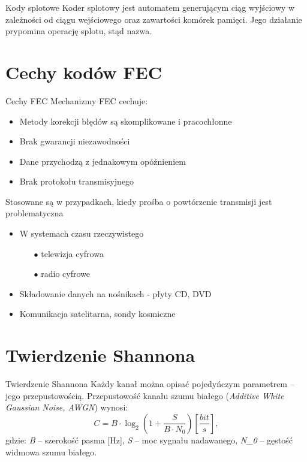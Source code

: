 \documentclass[12pt]{beamer}
\begin{document}
\begin{frame}{Kody splotowe}
Koder splotowy jest automatem generującym ciąg wyjściowy w zależności od ciągu wejściowego oraz zawartości komórek pamięci. Jego działanie prypomina operację splotu, stąd nazwa.
\end{frame}

\section{Cechy kodów FEC}
\begin{frame}{Cechy FEC}
Mechanizmy FEC cechuje:
\begin{itemize}
	\item Metody korekcji błędów są skomplikowane i pracochłonne
	\item Brak gwarancji niezawodności
	\item Dane przychodzą z jednakowym opóźnieniem
	\item Brak protokołu transmisyjnego
\end{itemize}
Stosowane są w przypadkach, kiedy prośba o powtórzenie transmisji jest problematyczna
\begin{itemize}
	\item W systemach czasu rzeczywistego
	\begin{itemize}
		\item[$\bullet$] telewizja cyfrowa
		\item[$\bullet$] radio cyfrowe		
	\end{itemize}
	\item Składowanie danych na nośnikach - płyty CD, DVD
	\item Komunikacja satelitarna, sondy kosmiczne
\end{itemize}
\end{frame}

\section{Twierdzenie Shannona}
\begin{frame}{Twierdzenie Shannona}
Każdy kanał można opisać pojedyńczym parametrem -- jego przepustowością.
Przepustowość kanału szumu białego (\emph{Additive White Gaussian Noise, AWGN}) wynosi:
\begin{equation}
C=B\cdot\log_2(1+\frac{S}{B \cdot N_0}) [\frac{bit}{s}],
\end{equation}
gdzie: \emph{B} -- szerokość pasma [Hz], \emph{S} -- moc sygnału nadawanego,
\emph{N_{0}} -- gęstość widmowa szumu białego.
\end{frame}
\end{document}
